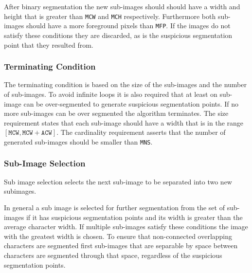 	After binary segmentation the new sub-images should should have a width and height that is greater than \texttt{MCW} and \texttt{MCH} respectively. Furthermore both sub-images should have a more foreground pixels than \texttt{MFP}. If the images do not satisfy these conditions they are discarded, as is the suspicious segmentation point that they resulted from. 

\subsubsection{Terminating Condition}
	\label{sss:method:segmentation:terminatingCondition}
	The terminating condition is based on the size of the sub-images and the number of sub-images. To avoid infinite loops it is also required that at least on sub-image can be over-segmented to generate suspicious segmentation points. If no more sub-images can be over segmented the algorithm terminates. The size requirement states that each sub-image should have a width that is in the range $[\mathtt{MCW}, \mathtt{MCW} + \mathtt{ACW}]$. The cardinality requirement asserts that the number of generated sub-images should be smaller than \texttt{MNS}.

\subsubsection{Sub-Image Selection}
	\label{sss:method:segmentation:subImageSelection}
	Sub image selection selects the next sub-image to be separated into two new subimages.

	In general a sub image is selected for further segmentation from the set of sub-images if it has suspicious segmentation points and its width is greater than the average character width. If multiple sub-images satisfy these conditions the image with the greatest width is chosen. To ensure that non-connected overlapping characters are segmented first sub-images that are separable by space between characters are segmented through that space, regardless of the suspicious segmentation points.